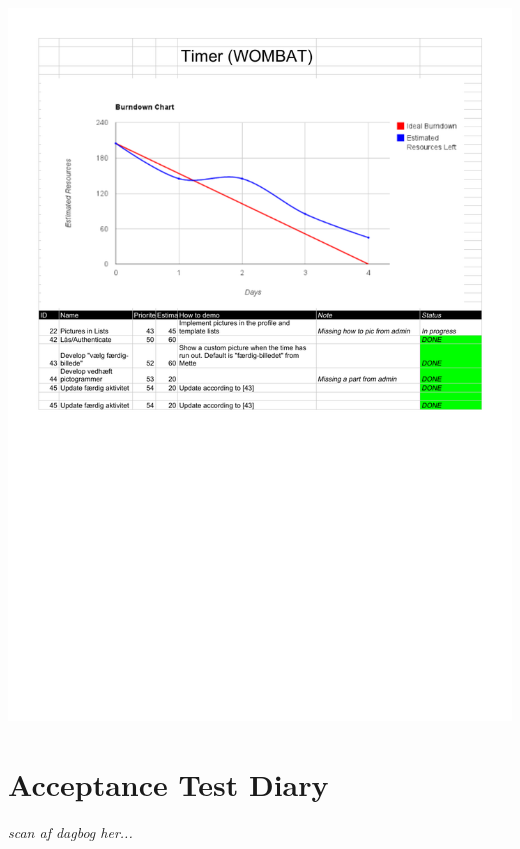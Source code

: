 \begin{center}
		\includegraphics[width=\textwidth]{Development/burndown_charts/Sprint_6.pdf}
	\end{center}
	
	
	\section{Acceptance Test Diary}
	\label{sec:diary}
	
	\textit{scan af dagbog her...}